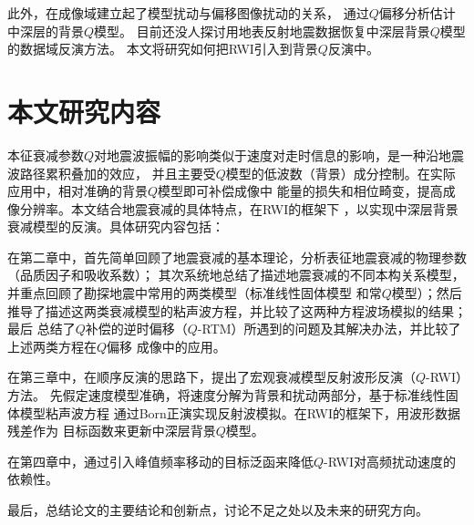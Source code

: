 此外，在成像域建立起了模型扰动与偏移图像扰动的关系，
通过$Q$偏移分析估计中深层的背景$Q$模型。
目前还没人探讨用地表反射地震数据恢复中深层背景$Q$模型的数据域反演方法。
本文将研究如何把RWI引入到背景$Q$反演中。

\vspace{0.9cm}
\section{本文研究内容}
\vspace{0.5cm}

本征衰减参数$Q$对地震波振幅的影响类似于速度对走时信息的影响，是一种沿地震波路径累积叠加的效应，
并且主要受$Q$模型的低波数（背景）成分控制。在实际应用中，相对准确的背景$Q$模型即可补偿成像中
能量的损失和相位畸变，提高成像分辨率。本文结合地震衰减的具体特点，在RWI的框架下
，以实现中深层背景衰减模型的反演。具体研究内容包括：

在第二章中，首先简单回顾了地震衰减的基本理论，分析表征地震衰减的物理参数（品质因子和吸收系数）；
其次系统地总结了描述地震衰减的不同本构关系模型，并重点回顾了勘探地震中常用的两类模型（标准线性固体模型
和常$Q$模型）；然后推导了描述这两类衰减模型的粘声波方程，并比较了这两种方程波场模拟的结果；最后
总结了$Q$补偿的逆时偏移（$Q$-RTM）所遇到的问题及其解决办法，并比较了上述两类方程在$Q$偏移
成像中的应用。

在第三章中，在顺序反演的思路下，提出了宏观衰减模型反射波形反演（$Q$-RWI）方法。
先假定速度模型准确，将速度分解为背景和扰动两部分，基于标准线性固体模型粘声波方程
通过Born正演实现反射波模拟。在RWI的框架下，用波形数据残差作为
目标函数来更新中深层背景$Q$模型。

在第四章中，通过引入峰值频率移动的目标泛函来降低$Q$-RWI对高频扰动速度的依赖性。

最后，总结论文的主要结论和创新点，讨论不足之处以及未来的研究方向。

















